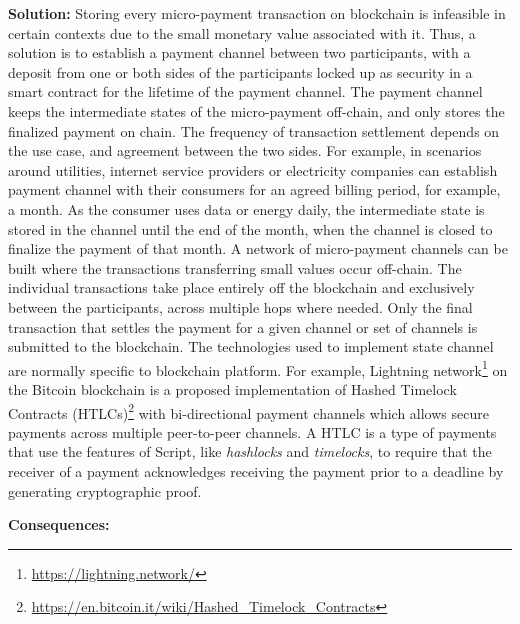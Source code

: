 \vspace{0.5em}\noindent \textbf{Solution:} 
Storing every micro-payment transaction on blockchain is infeasible in certain contexts due to the small monetary value associated with it. Thus, a solution is to establish a payment channel between two participants, with a deposit from one or both sides of the participants locked up as security in a smart contract for the lifetime of the payment channel. The payment channel keeps the intermediate states of the micro-payment off-chain, and only stores the finalized payment on chain. The frequency of transaction settlement depends on the use case, and agreement between the two sides. For example, in scenarios around utilities, internet service providers or electricity companies can establish payment channel with their consumers for an agreed billing period, for example, a month. As the consumer uses data or energy daily, the intermediate state is stored in the channel until the end of the month, when the channel is closed to finalize the payment of that month. A network of micro-payment channels can be built where the transactions transferring small values occur off-chain. The individual transactions take place entirely off the blockchain and exclusively between the participants, across multiple hops where needed. Only the final transaction that settles the payment for a given channel or set of channels is submitted to the blockchain. The technologies used to implement state channel are normally specific to blockchain platform. For example, Lightning network\footnote{\url{https://lightning.network/}} on the Bitcoin blockchain is a proposed implementation of Hashed Timelock Contracts (HTLCs)\footnote{\url{https://en.bitcoin.it/wiki/Hashed_Timelock_Contracts}} with bi-directional payment channels which allows secure payments across multiple peer-to-peer channels. A HTLC is a type of payments that use the features of Script, like \textit{hashlocks} and \textit{timelocks}, to require that the receiver of a payment acknowledges receiving the payment prior to a deadline by generating cryptographic proof. 


\vspace{0.5em}\noindent \textbf{Consequences:} 

